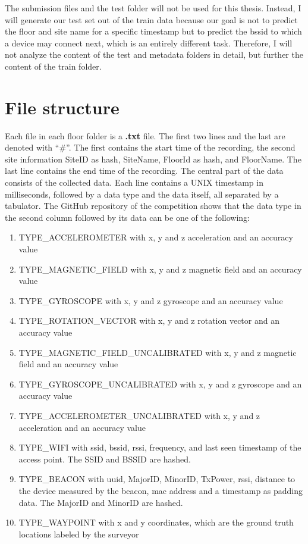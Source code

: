 The submission files and the test folder will not be used for this thesis.
Instead, I will generate our test set out of the train data because our goal is not to predict the floor and site name for a specific timestamp but to predict the \ac{bssid} to which a device may connect next, which is an entirely different task.
Therefore, I will not analyze the content of the test and metadata folders in detail, but further the content of the train folder.


\section{File structure}\label{sec:file-structure}

Each file in each floor folder is a \textbf{.txt} file. 
The first two lines and the last are denoted with ``\#''.
The first contains the start time of the recording, the second site information SiteID as hash, SiteName, FloorId as hash, and FloorName.
The last line contains the end time of the recording.
The central part of the data consists of the collected data. 
Each line contains a UNIX timestamp in milliseconds, followed by a data type and the data itself, all separated by a tabulator.
The GitHub repository of the competition \cite{GitHubComp} shows that the data type in the second column followed by its data can be one of the following:

\begin{enumerate}
    \item\label{type:acce} TYPE\_ACCELEROMETER with x, y and z acceleration and an accuracy value
    \item\label{type:mag} TYPE\_MAGNETIC\_FIELD with x, y and z magnetic field and an accuracy value
    \item\label{type:gyro} TYPE\_GYROSCOPE with x, y and z gyroscope and an accuracy value
    \item\label{type:rot} TYPE\_ROTATION\_VECTOR with x, y and z rotation vector and an accuracy value
    \item\label{type:mag_u} TYPE\_MAGNETIC\_FIELD\_UNCALIBRATED with x, y and z magnetic field and an accuracy value
    \item\label{type:gyro_u} TYPE\_GYROSCOPE\_UNCALIBRATED with x, y and z gyroscope and an accuracy value
    \item\label{type:acce_u} TYPE\_ACCELEROMETER\_UNCALIBRATED with x, y and z acceleration and an accuracy value
    \item\label{type:wifi} TYPE\_WIFI with \ac{ssid}, \ac{bssid}, \ac{rssi}, frequency, and last seen timestamp of the access point. The SSID and BSSID are hashed.
    \item\label{type:beacon} TYPE\_BEACON with \ac{uuid}, \ac{MajorID}, \ac{MinorID}, \ac{TxPower}, \ac{rssi}, distance to the device measured by the beacon, \ac{mac} address and a timestamp as padding data. The MajorID and MinorID are hashed.
    \item\label{type:way} TYPE\_WAYPOINT with x and y coordinates, which are the ground truth locations labeled by the surveyor
\end{enumerate}

